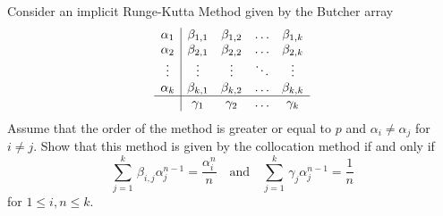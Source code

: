\begin{question}
Consider an implicit Runge-Kutta Method given by the Butcher array
\[
\begin{array}{c|cccc}
\alpha_1 & \beta_{1,1} & \beta_{1,2} & \ldots & \beta_{1,k} \\
\alpha_2 & \beta_{2,1} & \beta_{2,2} & \ldots & \beta_{2,k} \\
 \vdots & \vdots & \vdots & \ddots & \vdots \\
\alpha_k & \beta_{k,1} & \beta_{k,2} & \ldots & \beta_{k,k} \\
\hline
& \gamma_1 & \gamma_2 & \ldots & \gamma_k \\
\end{array}
\]
Assume that the order of the method is greater or equal to $p$ and
$\alpha_i \not= \alpha_j$ for $i\neq j$.  Show that this method is
given by the collocation method if and only if
\begin{equation}\label{GradQ7}
\sum_{j=1}^k \, \beta_{i,j} \alpha_j^{n-1} = \frac{\alpha_i^n}{n}
\quad \text{and} \quad
\sum_{j=1}^k \, \gamma_j \alpha_j^{n-1} = \frac{1}{n}
\end{equation}
for $1 \leq i,n \leq k$.
\end{question}

